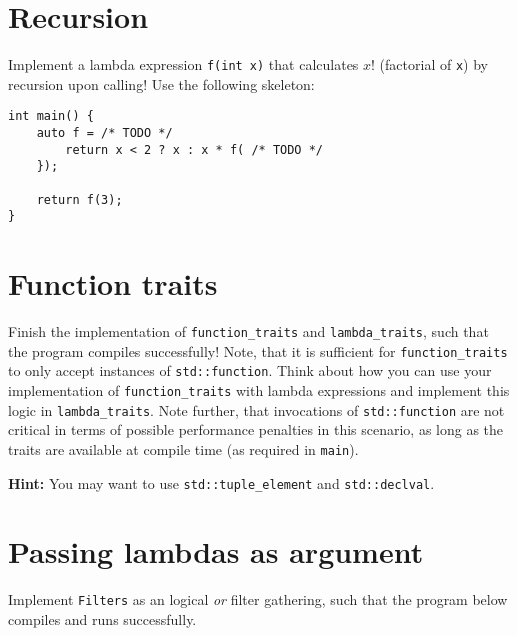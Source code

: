 \documentclass{scrartcl}
\newcommand{\inputcpplisting}[1]{}
\begin{document}
\section{Recursion}
Implement a lambda expression \texttt{f(int x)} that calculates $x!$ (factorial of \texttt{x}) by recursion upon calling!
Use the following skeleton:
\begin{lstlisting}
int main() {
    auto f = /* TODO */
        return x < 2 ? x : x * f( /* TODO */
    });

    return f(3);
}
\end{lstlisting}

\section{Function traits}
\label{sec:fcttraits}
Finish the implementation of \texttt{function\_traits} and \texttt{lambda\_traits}, such that the program compiles successfully! Note, that it is sufficient for \texttt{function\_traits} to only accept instances of \texttt{std::function}. Think about how you can use your implementation of \texttt{function\_traits} with lambda expressions and implement this logic in \texttt{lambda\_traits}. Note further, that invocations of \texttt{std::function} are not critical in terms of possible performance penalties in this scenario, as long as the traits are available at compile time (as required in \texttt{main}).

\inputcpplisting{snippet21a}

\textbf{Hint:} You may want to use \texttt{std::tuple\_element} and \texttt{std::declval}.

\newpage

\section{Passing lambdas as argument}
Implement \texttt{Filters} as an logical \textit{or} filter gathering, such that the program below compiles and runs successfully.

\inputcpplisting{snippet20a}
\end{document}
